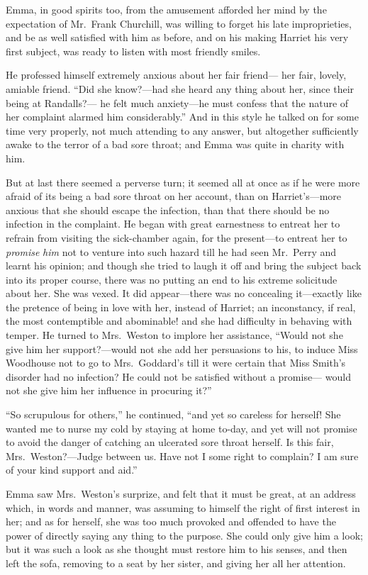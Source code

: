 Emma, in good spirits too, from the amusement afforded her mind
by the expectation of Mr.\ Frank Churchill, was willing to forget
his late improprieties, and be as well satisfied with him as before,
and on his making Harriet his very first subject, was ready to listen
with most friendly smiles.

He professed himself extremely anxious about her fair friend---%
her fair, lovely, amiable friend.  ``Did she know?---had she
heard any thing about her, since their being at Randalls?---%
he felt much anxiety---he must confess that the nature of her
complaint alarmed him considerably.''  And in this style he talked
on for some time very properly, not much attending to any answer,
but altogether sufficiently awake to the terror of a bad sore throat;
and Emma was quite in charity with him.

But at last there seemed a perverse turn; it seemed all at once as if
he were more afraid of its being a bad sore throat on her account,
than on Harriet's---more anxious that she should escape the infection,
than that there should be no infection in the complaint.  He began
with great earnestness to entreat her to refrain from visiting
the sick-chamber again, for the present---to entreat her to \emph{promise}
\emph{him} not to venture into such hazard till he had seen Mr.\ Perry
and learnt his opinion; and though she tried to laugh it off
and bring the subject back into its proper course, there was no
putting an end to his extreme solicitude about her.  She was vexed.
It did appear---there was no concealing it---exactly like the pretence
of being in love with her, instead of Harriet; an inconstancy,
if real, the most contemptible and abominable! and she had difficulty
in behaving with temper.  He turned to Mrs.\ Weston to implore
her assistance, ``Would not she give him her support?---would not she
add her persuasions to his, to induce Miss Woodhouse not to go
to Mrs.\ Goddard's till it were certain that Miss Smith's disorder
had no infection?  He could not be satisfied without a promise---%
would not she give him her influence in procuring it?''

``So scrupulous for others,'' he continued, ``and yet so careless
for herself!  She wanted me to nurse my cold by staying at home to-day,
and yet will not promise to avoid the danger of catching an ulcerated
sore throat herself.  Is this fair, Mrs.\ Weston?---Judge between us.
Have not I some right to complain?  I am sure of your kind support
and aid.''

Emma saw Mrs.\ Weston's surprize, and felt that it must be great,
at an address which, in words and manner, was assuming to himself
the right of first interest in her; and as for herself, she was
too much provoked and offended to have the power of directly
saying any thing to the purpose.  She could only give him a look;
but it was such a look as she thought must restore him to his senses,
and then left the sofa, removing to a seat by her sister, and giving
her all her attention.

